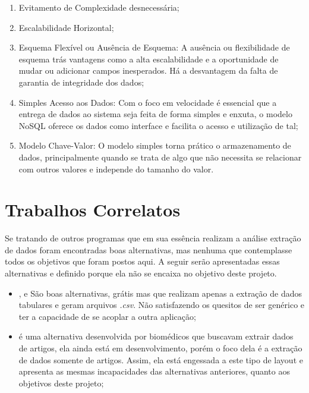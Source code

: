 \begin{enumerate}
\begin{enumerate}
    \item Evitamento de Complexidade desnecessária;
    \item Escalabilidade Horizontal;
    \item Esquema Flexível ou Ausência de Esquema: A ausência ou flexibilidade de esquema trás vantagens como a alta escalabilidade e a oportunidade de mudar ou adicionar campos inesperados. Há a desvantagem da falta de garantia de integridade dos dados;
    \item Simples Acesso aos Dados: Com o foco em velocidade é essencial que a entrega de dados ao sistema seja feita de forma simples e enxuta, o modelo NoSQL oferece os dados como interface e facilita o acesso e utilização de tal;
    \item Modelo Chave-Valor: O modelo simples torna prático o armazenamento de dados, principalmente quando se trata de algo que não necessita se relacionar com outros valores e independe do tamanho do valor.
\end{enumerate}
  
\section{Trabalhos Correlatos}  

Se tratando de outros programas que em sua essência realizam a análise extração de dados foram encontradas boas alternativas, mas nenhuma que contemplasse todos os objetivos que foram postos aqui. A seguir serão apresentadas essas alternativas e definido porque ela não se encaixa no objetivo deste projeto.

\begin{itemize}
    \item \textbf{\cite{pdft}}, \textbf{\cite{fpdfc}} e \textbf{\cite{tabula}} São boas alternativas, grátis mas que realizam apenas a extração de dados tabulares e geram arquivos \textit{.csv}. Não satisfazendo os quesitos de ser genérico e ter a capacidade de se acoplar a outra aplicação;
    
    \item \textbf{\cite{lapdf}} é uma alternativa desenvolvida por biomédicos que buscavam extrair dados de artigos, ela ainda está em desenvolvimento, porém o foco dela é a extração de dados somente de artigos. Assim, ela está engessada a este tipo de layout e apresenta as mesmas incapacidades das alternativas anteriores, quanto aos objetivos deste projeto;
    

\end{itemize}
\end{enumerate}
